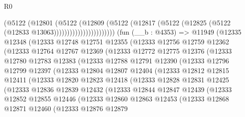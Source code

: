 \begin{lexlean}{R0}
\begin{coremodule}
                              (@5122
                                (@12801
                                  (@5122
                                    (@12809
                                      (@5122
                                        (@12817
                                          (@5122
                                            (@12825 (@5122 (@12833 @13063)))))))))))))))))))))))
    (fun (__b : @4353) =>
    @11949
      (@12335
        @12348
        (@12333
          @12748
          @12751
          @12355
          (@12333
            @12756
            @12759
            @12362
            (@12333
              @12764
              @12767
              @12369
              (@12333
                @12772
                @12775
                @12376
                (@12333
                  @12780
                  @12783
                  @12383
                  (@12333
                    @12788
                    @12791
                    @12390
                    (@12333
                      @12796
                      @12799
                      @12397
                      (@12333
                        @12804
                        @12807
                        @12404
                        (@12333
                          @12812
                          @12815
                          @12411
                          (@12333
                            @12820
                            @12823
                            @12418
                            (@12333
                              @12828
                              @12831
                              @12425
                              (@12333
                                @12836
                                @12839
                                @12432
                                (@12333
                                  @12844
                                  @12847
                                  @12439
                                  (@12333
                                    @12852
                                    @12855
                                    @12446
                                    (@12333
                                      @12860
                                      @12863
                                      @12453
                                      (@12333
                                        @12868
                                        @12871
                                        @12460
                                        (@12333
                                          @12876
                                          @12879

\end{coremodule}
\end{lexlean}
